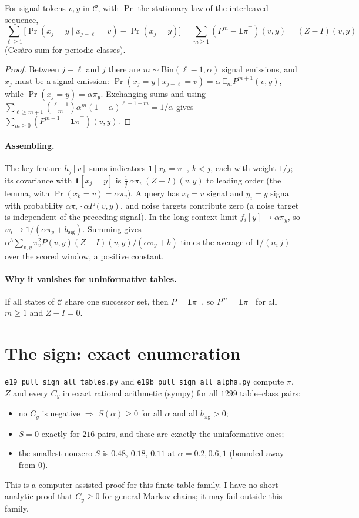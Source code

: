 \documentclass[11pt]{article}
\theoremstyle{remark}\newtheorem{remark}{Remark}
\newcommand{\1}{\mathbf{1}}
\begin{document}
\begin{lemma}
For signal tokens $v,y$ in $\mathcal C$, with $\Pr$ the stationary law of the interleaved sequence,
\[
\sum_{\ell\ge1}\Big[\Pr(x_j=y\mid x_{j-\ell}=v)-\Pr(x_j=y)\Big]=\sum_{m\ge1}(P^m-\mathbf 1\pi^\top)(v,y)=(Z-I)(v,y)
\]
(Ces\`aro sum for periodic classes).
\end{lemma}
\begin{proof}
Between $j-\ell$ and $j$ there are $m\sim\mathrm{Bin}(\ell-1,\alpha)$ signal emissions, and $x_j$ must be a
signal emission: $\Pr(x_j=y\mid x_{j-\ell}=v)=\alpha\,\mathbb E_m P^{m+1}(v,y)$, while
$\Pr(x_j=y)=\alpha\pi_y$. Exchanging sums and using $\sum_{\ell\ge m+1}\binom{\ell-1}{m}\alpha^m(1-\alpha)^{\ell-1-m}=1/\alpha$
gives $\sum_{m\ge0}(P^{m+1}-\mathbf1\pi^\top)(v,y)$.
\end{proof}

\paragraph{Assembling.} The key feature $h_j[v]$ sums indicators $\1[x_k=v]$, $k<j$, each with weight
$1/j$; its covariance with $\1[x_j=y]$ is $\frac1j\,\alpha\pi_v\,(Z-I)(v,y)$ to leading order (the
lemma, with $\Pr(x_k=v)=\alpha\pi_v$). A query has $x_i=v$ signal and $y_i=y$ signal with probability
$\alpha\pi_v\cdot\alpha P(v,y)$, and noise targets contribute zero (a noise target is independent of
the preceding signal). In the long-context limit $f_i[y]\to\alpha\pi_y$, so
$w_i\to1/(\alpha\pi_y+b_{\mathrm{sig}})$. Summing gives $\alpha^3\sum_{v,y}\pi_v^2P(v,y)(Z-I)(v,y)/(\alpha\pi_y+b)$
times the average of $1/(n_i\,j)$ over the scored window, a positive constant.

\paragraph{Why it vanishes for uninformative tables.} If all states of $\mathcal C$ share one
successor set, then $P=\mathbf1\pi^\top$, so $P^m=\mathbf1\pi^\top$ for all $m\ge1$ and $Z-I=0$.

\section{The sign: exact enumeration}
\texttt{e19\_pull\_sign\_all\_tables.py} and \texttt{e19b\_pull\_sign\_all\_alpha.py} compute $\pi$, $Z$
and every $C_y$ in exact rational arithmetic (sympy) for all $1299$ table--class pairs:
\begin{itemize}
\item no $C_y$ is negative $\Rightarrow$ $S(\alpha)\ge0$ for all $\alpha$ and all $b_{\mathrm{sig}}>0$;
\item $S=0$ exactly for $216$ pairs, and these are exactly the uninformative ones;
\item the smallest nonzero $S$ is $0.48$, $0.18$, $0.11$ at $\alpha=0.2,0.6,1$ (bounded away from 0).
\end{itemize}
This is a computer-assisted proof for this finite table family. I have no short analytic proof that
$C_y\ge0$ for general Markov chains; it may fail outside this family.
\end{document}
